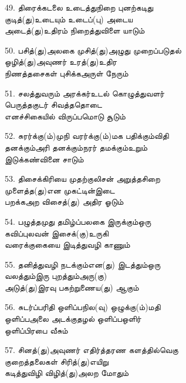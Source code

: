 49. திரைக்கடலை உடைத்துநிறை புனற்கடிது\\
         குடித்(து)உடையும் உடைப்(பு) அடைய\\
         அடைத்(து)உதிரம் நிறைத்துவிளை யாடும் \thiru



50. பசித்(து)அலகை முசித்(து)அழுது முறைப்படுதல்\\
         ஒழித்(து)அவுணர் உரத்(து)உதிர\\
         நிணத்தசைகள் புசிக்கஅருள் நேரும் \thiru



51. சலத்துவரும் அரக்கர்உடல் கொழுத்துவளர்\\
         பெருத்தகுடர் சிவத்ததொடை\\
         எனச்சிகையில் விருப்பமொடு சூடும் \thiru



52. சுரர்க்கு(ம்)முநி வரர்க்கு(ம்)மக பதிக்கும்விதி\\
         தனக்கும்அரி தனக்கும்நரர் தமக்கும்உறும்\\
         இடுக்கண்வினை சாடும் \thiru



53. திசைக்கிரியை முதற்குலிசன் அறுத்தசிறை\\
         முளைத்த(து)என முகட்டின்இடை\\
         பறக்கஅற விசைத்(து) அதிர ஓடும் \thiru



54. பழுத்தமுது தமிழ்ப்பலகை இருக்கும்ஒரு\\
         கவிப்புலவன் இசைக்(கு)உருகி\\
         வரைக்குகையை இடித்துவழி காணும் \thiru



55. தனித்துவழி நடக்கும்என(து) இடத்தும்ஒரு\\
         வலத்தும்இரு புறத்தும்அரு(கு)\\
         அடுத்(து)இரவு பகற்றுணைய(து) ஆகும் \thiru



56. சுடர்ப்பரிதி ஒளிப்பநில(வு) ஒழுக்கு(ம்)மதி\\
         ஒளிப்பஅலை அடக்குதழல் ஒளிப்பஒளிர்\\
         ஒளிப்பிரபை வீசும் \thiru



57. சினத்(து)அவுணர் எதிர்த்தரண களத்தில்வெகு\\
         குறைத்தலைகள் சிரித்(து)எயிறு\\
         கடித்துவிழி விழித்(து)அலற மோதும் \thiru



